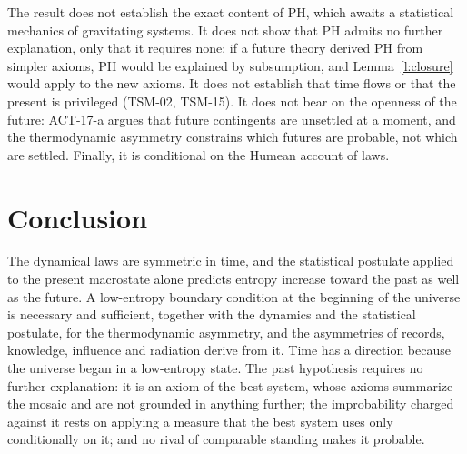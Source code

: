 \documentclass{situationist-preprint}
\begin{document}
The result does not establish the exact content of PH, which awaits a statistical mechanics of gravitating systems. It does not show that PH admits no further explanation, only that it requires none: if a future theory derived PH from simpler axioms, PH would be explained by subsumption, and Lemma~\ref{l:closure} would apply to the new axioms. It does not establish that time flows or that the present is privileged (TSM-02, TSM-15). It does not bear on the openness of the future: ACT-17-a argues that future contingents are unsettled at a moment, and the thermodynamic asymmetry constrains which futures are probable, not which are settled. Finally, it is conditional on the Humean account of laws.

\section{Conclusion}

The dynamical laws are symmetric in time, and the statistical postulate applied to the present macrostate alone predicts entropy increase toward the past as well as the future. A low-entropy boundary condition at the beginning of the universe is necessary and sufficient, together with the dynamics and the statistical postulate, for the thermodynamic asymmetry, and the asymmetries of records, knowledge, influence and radiation derive from it. Time has a direction because the universe began in a low-entropy state. The past hypothesis requires no further explanation: it is an axiom of the best system, whose axioms summarize the mosaic and are not grounded in anything further; the improbability charged against it rests on applying a measure that the best system uses only conditionally on it; and no rival of comparable standing makes it probable.
\end{document}
